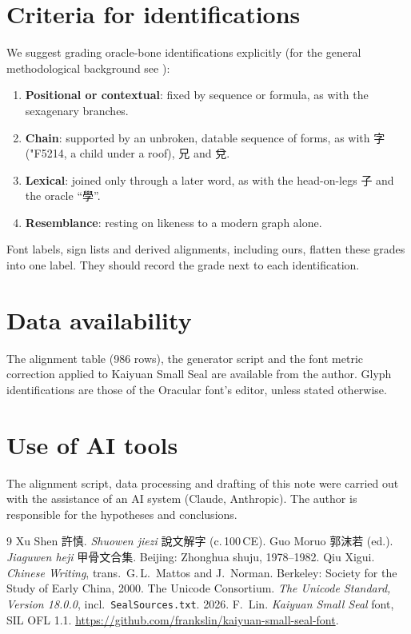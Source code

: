 \documentclass[11pt,a4paper]{article}
\newcommand{\og}[1]{{\oraclefont\char"#1}}
\begin{document}
\section{Criteria for identifications}
We suggest grading oracle-bone identifications explicitly (for the general methodological background see \cite{qiu}):
\begin{enumerate}
\item \textbf{Positional or contextual}: fixed by sequence or formula, as with the sexagenary branches.
\item \textbf{Chain}: supported by an unbroken, datable sequence of forms, as with 字 (\og{F5214}, a child under a roof), 兄 and 兌.
\item \textbf{Lexical}: joined only through a later word, as with the head-on-legs 子 and the oracle ``學''.
\item \textbf{Resemblance}: resting on likeness to a modern graph alone.
\end{enumerate}
Font labels, sign lists and derived alignments, including ours, flatten these grades into one label. They should record the grade next to each identification.

\section*{Data availability}
The alignment table (986 rows), the generator script and the font metric correction applied to Kaiyuan Small Seal are available from the author. Glyph identifications are those of the Oracular font's editor, unless stated otherwise.

\section*{Use of AI tools}
The alignment script, data processing and drafting of this note were carried out with the assistance of an AI system (Claude, Anthropic). The author is responsible for the hypotheses and conclusions.

\begin{thebibliography}{9}
 Xu Shen 許慎. \emph{Shuowen jiezi} 說文解字 (c.\,100\,CE).
 Guo Moruo 郭沫若 (ed.). \emph{Jiaguwen heji} 甲骨文合集. Beijing: Zhonghua shuju, 1978--1982.
 Qiu Xigui. \emph{Chinese Writing}, trans.\ G.\,L.\ Mattos and J.\ Norman. Berkeley: Society for the Study of Early China, 2000.
 The Unicode Consortium. \emph{The Unicode Standard, Version 18.0.0}, incl.\ \texttt{SealSources.txt}. 2026.
 F.\ Lin. \emph{Kaiyuan Small Seal} font, SIL OFL 1.1. \url{https://github.com/frankslin/kaiyuan-small-seal-font}.
\end{thebibliography}
\end{document}
